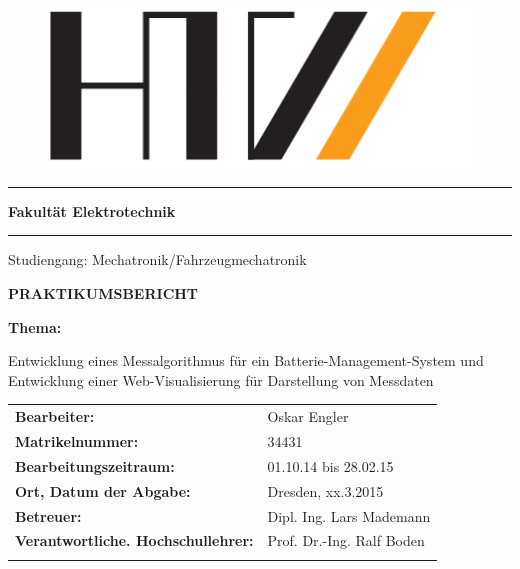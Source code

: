 
\thispagestyle{empty} 		%
\begin{figure}
\includegraphics[scale=0.3]{images/HTW-Logo}
\end{figure}

\hrule
\vspace{0.2 cm}
\textbf{Fakult\"at Elektrotechnik}
\vspace{0.1 cm}
\hrule
\vspace{0.2 cm}
Studiengang: Mechatronik/Fahrzeugmechatronik 

\begin{center}
\vspace{2 cm}
\huge\textbf{PRAKTIKUMSBERICHT}\\
\vspace{1 cm}
\end{center}
\Large\textbf{Thema:}
\begin{center}
\Large{Entwicklung eines Messalgorithmus für ein Batterie-Management-System und\\ Entwicklung einer Web-Visualisierung für Darstellung von Messdaten}
\end{center}
\vspace{1 cm}

\begin{tabular}{lL{7cm}}
\Large\textbf{Bearbeiter:} & \Large{Oskar Engler}\\
\Large\textbf{Matrikelnummer:} & \Large{34431}\\
\Large\textbf{Bearbeitungszeitraum:} & \Large{01.10.14 bis 28.02.15}\\
\Large\textbf{Ort, Datum der Abgabe:} & \Large{Dresden, xx.3.2015}\\
\Large\textbf{Betreuer:} & \Large{Dipl. Ing. Lars Mademann}\\
\Large\textbf{Verantwortliche. Hochschullehrer:} \hspace{1 cm} & \Large{Prof. Dr.-Ing. Ralf Boden}\\
\vspace{1 cm}\\

\end{tabular}